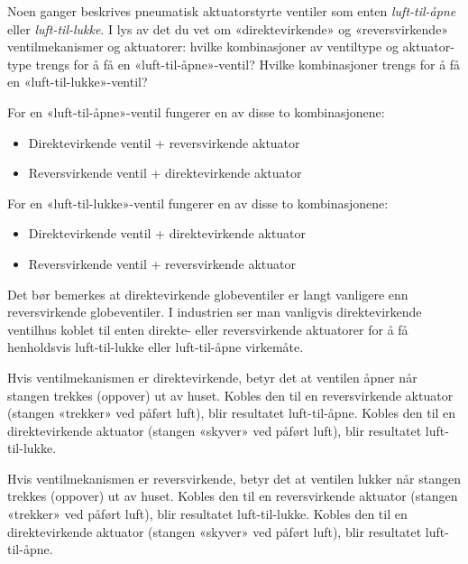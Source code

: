 

Noen ganger beskrives pneumatisk aktuatorstyrte ventiler som enten {\it luft-til-åpne} eller {\it luft-til-lukke}. I lys av det du vet om «direktevirkende» og «reversvirkende» ventilmekanismer og aktuatorer: hvilke kombinasjoner av ventiltype og aktuator-type trengs for å få en «luft-til-åpne»-ventil? Hvilke kombinasjoner trengs for å få en «luft-til-lukke»-ventil?







For en «luft-til-åpne»-ventil fungerer en av disse to kombinasjonene:

\begin{itemize}
\item{} Direktevirkende ventil + reversvirkende aktuator
\item{} Reversvirkende ventil + direktevirkende aktuator
\end{itemize}

\vskip 10pt

For en «luft-til-lukke»-ventil fungerer en av disse to kombinasjonene:

\begin{itemize}
\item{} Direktevirkende ventil + direktevirkende aktuator
\item{} Reversvirkende ventil + reversvirkende aktuator
\end{itemize}

\vskip 10pt

Det bør bemerkes at direktevirkende globeventiler er langt vanligere enn reversvirkende globeventiler. I industrien ser man vanligvis direktevirkende ventilhus koblet til enten direkte- eller reversvirkende aktuatorer for å få henholdsvis luft-til-lukke eller luft-til-åpne virkemåte.







Hvis ventilmekanismen er direktevirkende, betyr det at ventilen åpner når stangen trekkes (oppover) ut av huset. Kobles den til en reversvirkende aktuator (stangen «trekker» ved påført luft), blir resultatet luft-til-åpne. Kobles den til en direktevirkende aktuator (stangen «skyver» ved påført luft), blir resultatet luft-til-lukke.

Hvis ventilmekanismen er reversvirkende, betyr det at ventilen lukker når stangen trekkes (oppover) ut av huset. Kobles den til en reversvirkende aktuator (stangen «trekker» ved påført luft), blir resultatet luft-til-lukke. Kobles den til en direktevirkende aktuator (stangen «skyver» ved påført luft), blir resultatet luft-til-åpne.




